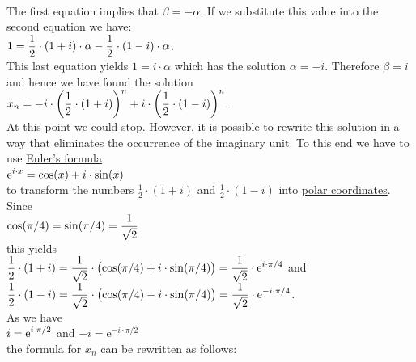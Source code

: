 \\[0.2cm]
The first equation implies that $\beta = -\alpha$.  If we substitute this value into the second equation we have:
\\[0.2cm]
\hspace*{1.3cm}
$\displaystyle 1 = \frac{1}{2} \cdot (1 + i) \cdot \alpha - \frac{1}{2} \cdot (1 - i) \cdot \alpha$.
\\[0.2cm]
This last equation yields $1 = i \cdot \alpha$ which has the solution $\alpha = -i$.  Therefore $\beta = i$
and hence we have found the solution
\\[0.2cm]
\hspace*{1.3cm}
$\displaystyle x_n = -i \cdot \left(\frac{1}{2} \cdot (1 + i)\right)^n + i \cdot \left(\frac{1}{2} \cdot (1 - i)\right)^n$.
\\[0.2cm]
At this point we could stop.  However, it is possible to rewrite this solution in a way that eliminates the
occurrence of the imaginary unit.  To this end we have to use
\href{https://en.wikipedia.org/wiki/Euler%27s_formula}{Euler's formula} 
\\[0.2cm]
\hspace*{1.3cm}
$\displaystyle \mathrm{e}^{i \cdot x} = \cos(x) + i \cdot \sin(x)$
\\[0.2cm]
to transform the numbers
$\frac{1}{2} \cdot (1 + i)$ and $\frac{1}{2} \cdot (1 - i)$ into
\href{https://en.wikipedia.org/wiki/Polar_coordinate_system#Complex_numbers}{polar coordinates}.  Since
\\[0.2cm]
\hspace*{1.3cm}
$\displaystyle \cos(\pi/4) = \sin(\pi/4) = \frac{1}{\sqrt{2}}$
\\[0.2cm]
this yields
\\[0.2cm]
\hspace*{1.3cm}
$\displaystyle \frac{1}{2} \cdot (1 + i) = \frac{1}{\sqrt{2}} \cdot \bigl(\cos(\pi/4) + i \cdot \sin(\pi/4) \bigr) =
 \frac{1}{\sqrt{2}} \cdot \mathrm{e}^{i \cdot\pi/4}$ \quad and 
\\[0.2cm]
\hspace*{1.3cm}
$\displaystyle \frac{1}{2} \cdot (1 - i) = \frac{1}{\sqrt{2}} \cdot \bigl(\cos(\pi/4) - i \cdot \sin(\pi/4) \bigr) =
 \frac{1}{\sqrt{2}} \cdot \mathrm{e}^{-i \cdot\pi/4}$. 
\\[0.2cm]
As we have 
\\[0.2cm]
\hspace*{1.3cm}
$\displaystyle i = \mathrm{e}^{i \cdot\pi/2}$  \quad and \quad $-i = \mathrm{e}^{-i \cdot\pi/2}$
\\[0.2cm]
the formula for $x_n$ can be rewritten as follows:
